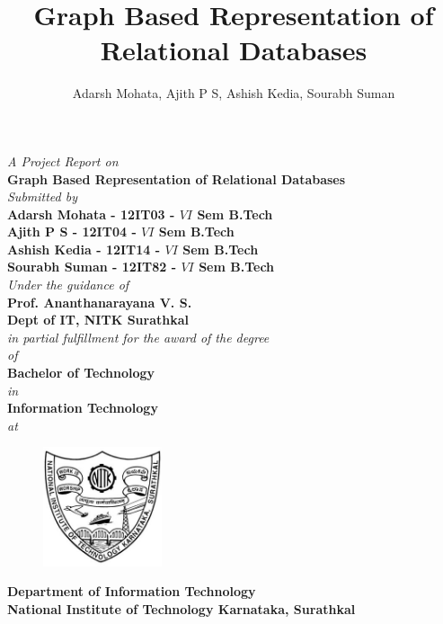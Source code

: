 \documentclass[12pt, oneside]{book}
\title{Graph Based Representation of Relational Databases}
\author{Adarsh Mohata, Ajith P S, Ashish Kedia, Sourabh Suman}
\newcommand{\project}{Graph Based Representation of Relational Databases}
\begin{document}
\begin{titlepage}
 \begin{center}
	\emph{A Project Report on} \\
\vspace{1cm}
\large
\textbf{\project} \\
\normalsize
\vspace{5mm}
\emph{Submitted by} \\
\vspace{5mm}
\textbf{Adarsh Mohata - 12IT03 - $VI$ Sem B.Tech} \\
\vspace{1mm}
\textbf{Ajith P S - 12IT04 - $VI$ Sem B.Tech} \\
\vspace{1mm}
\textbf{Ashish Kedia - 12IT14 - $VI$ Sem B.Tech} \\
\vspace{1mm}
\textbf{Sourabh Suman - 12IT82 - $VI$ Sem B.Tech} \\
\vspace{1cm}
\emph{Under the guidance of} \\
\vspace{1cm}
\textbf{Prof. Ananthanarayana V. S.} \\
\textbf{Dept of IT, NITK Surathkal} \\
\vspace{5mm}
\emph{in partial fulfillment for the award of the degree} \\
\vspace{5mm}
\emph{of} \\
\vspace{4mm}
\textbf{Bachelor of Technology} \\
\vspace{4mm}
\emph{in} \\
\vspace{4mm}
\textbf{Information Technology} \\
\vspace{5mm}
\emph{at} \\
\begin{figure}[H]
	\centering
	\includegraphics[height=3.5cm]{pics/nitk_logo.jpg}
\end{figure}
\vspace{1cm}
\textbf{Department of Information Technology} \\
\vspace{5mm}
\textbf{National Institute of Technology Karnataka, Surathkal} \\
\vspace{5mm}
\end{center}
\end{titlepage}
\end{document}
